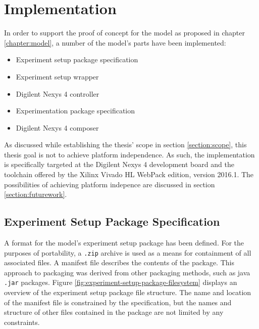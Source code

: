 \documentclass[main.tex]{subfiles}
\begin{document}
\chapter{Implementation}
In order to support the proof of concept for the model as proposed in chapter \ref{chapter:model}, a number of the model's parts have been implemented:
\begin{itemize}
    \item Experiment setup package specification
    \item Experiment setup wrapper
    \item Digilent Nexys 4 controller
    \item Experimentation package specification
    \item Digilent Nexys 4 composer
\end{itemize}

As discussed while establishing the thesis' scope in section \ref{section:scope}, this thesis goal is not to achieve platform independence. As such, the implementation is specifically targeted at the Digilent Nexys 4 development board and the toolchain offered by the Xilinx Vivado HL WebPack edition, version 2016.1. The possibilities of achieving platform indepence are discussed in section \ref{section:futurework}.

\section{Experiment Setup Package Specification}
\label{section:experiment-setup-package-specification}
A format for the model's experiment setup package has been defined. For the purposes of portability, a \texttt{.zip} archive is used as a means for containment of all associated files. A manifest file describes the contents of the package. This approach to packaging was derived from other packaging methods, such as java \texttt{.jar} packages. Figure \ref{fig:experiment-setup-package-filesystem} displays an overview of the experiment setup package file structure. The name and location of the manifest file is constrained by the specification, but the names and structure of other files contained in the package are not limited by any constraints.

\begin{figure}[h]
\centering
\caption{An overview of the experiment setup package file structure}
\label{fig:experiment-setup-package-filesystem}
\begin{subfigure}[b]{0.4\textwidth}
\end{subfigure}
\end{figure}
\end{document}
